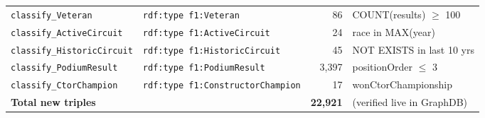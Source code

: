 \begin{center}
\begin{tabularx}{\linewidth}{@{}lXrp{3.5cm}@{}}
\texttt{classify\_Veteran}       & \texttt{rdf:type f1:Veteran}             & 86  & COUNT(results) $\geq$ 100 \\
\texttt{classify\_ActiveCircuit} & \texttt{rdf:type f1:ActiveCircuit}       & 24  & race in MAX(year) \\
\texttt{classify\_HistoricCircuit}& \texttt{rdf:type f1:HistoricCircuit}    & 45  & NOT EXISTS in last 10 yrs \\
\texttt{classify\_PodiumResult}  & \texttt{rdf:type f1:PodiumResult}        & 3{,}397 & positionOrder $\leq$ 3 \\
\texttt{classify\_CtorChampion}  & \texttt{rdf:type f1:ConstructorChampion} & 17  & wonCtorChampionship \\
\midrule
\multicolumn{2}{l}{\textbf{Total new triples}} & \textbf{22{,}921} & (verified live in GraphDB) \\
\bottomrule
\end{tabularx}
\end{center}
